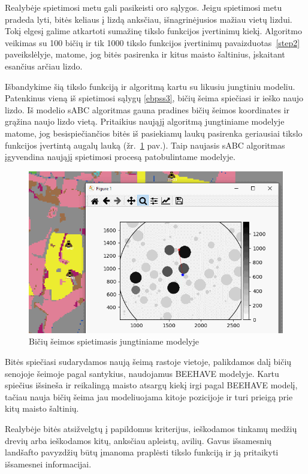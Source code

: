 \documentclass{VUMIFKompMagistrinis}
\begin{document}
Realybėje spietimosi metu gali pasikeisti oro sąlygos. Jeigu spietimosi metu pradeda lyti, bitės keliaus į lizdą anksčiau, išnagrinėjusios mažiau vietų lizdui. Tokį elgesį galime atkartoti sumažinę tikslo funkcijos įvertinimų kiekį. Algoritmo veikimas su 100 bičių ir tik 1000 tikslo funkcijos įvertinimų pavaizduotas~\ref{step2} paveikslėlyje, matome, jog bitės pasirenka ir kitus maisto šaltinius, įskaitant esančius arčiau lizdo. 




Išbandykime šią tikslo funkciją ir algoritmą kartu su likusiu jungtiniu modeliu. Patenkinus vieną iš spietimosi sąlygų \eqref{ebpss3}, bičių šeima spiečiasi ir ieško naujo lizdo. Iš modelio sABC algoritmas gauna pradines bičių šeimos koordinates ir grąžina naujo lizdo vietą. Pritaikius naująjį algoritmą jungtiniame modelyje matome, jog besispiečiančios bitės iš pasiekiamų laukų pasirenka geriausiai tikslo funkcijos įvertintą augalų lauką (žr.~\ref{img:fin1} pav.). Taip naujasis sABC algoritmas įgyvendina naująjį spietimosi procesą patobulintame modelyje.

\begin{figure}
    \centering
    \includegraphics[scale=0.75]{img/new/mags.png}
     \caption{Bičių šeimos spietimasis jungtiniame modelyje}
    \label{img:fin1}
\end{figure}

Bitės spiečiasi sudarydamos naują šeimą rastoje vietoje, palikdamos dalį bičių senojoje šeimoje pagal santykius, naudojamus BEEHAVE modelyje. Kartu spiečius išsineša ir reikalingą maisto atsargų kiekį irgi pagal BEEHAVE modelį, tačiau nauja bičių šeima jau modeliuojama kitoje pozicijoje ir turi prieigą prie kitų maisto šaltinių.

Realybėje bitės atsižvelgtų į papildomus kriterijus, ieškodamos tinkamų medžių drevių arba ieškodamos kitų, anksčiau apleistų, avilių. Gavus išsamesnių landšafto pavyzdžių būtų įmanoma praplėsti tikslo funkciją ir ją pritaikyti išsamesnei informacijai. 
\end{document}
